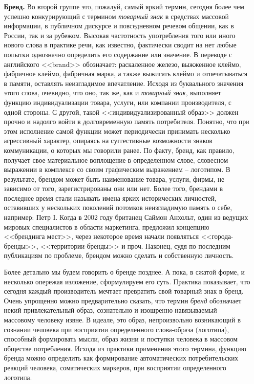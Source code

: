 \textbf{Бренд.} Во второй группе это, пожалуй, самый яркий термин,
  сегодня более чем успешно конкурирующий с термином \emph{товарный знак} в
  средствах массовой информации, в публичном дискурсе и повседневном речевом
  общении, как в России, так и за рубежом. Высокая частотность употребления
  того или иного нового слова в практике речи, как известно, фактически
  сводит на нет любые попытки однозначно определить его содержание или значение.
  В переводе с английского <<brand>> обозначает: раскаленное железо, выжженное
  клеймо, фабричное клеймо, фабричная марка, а также выжигать клеймо и
  отпечатываться в памяти, оставлять неизгладимое впечатление\autocite{oxford_dictionary}.
  Исходя из буквального значения этого слова, очевидно, что оно,
  так же, как и \emph{товарный знак}, выполняет функцию индивидуализации товара,
  услуги, или компании производителя, с одной стороны. С другой, такой
  <<индивидуализированный образ>> должен прочно и надолго войти в долговременную
  память потребителя. Понятно, что при этом исполнение самой функции может
  периодически принимать несколько агрессивный характер, опираясь на
  суггестивные возможности знаков коммуникации, о которых мы говорили ранее.
  По факту, бренд, как правило, получает свое материальное воплощение
  в определенном слове, словесном выражении в комплексе со своим
  графическим выражением -- логотипом. В результате, брендом может быть
  наименование товара, услуги, фирмы, не зависимо от того, зарегистрированы
  они или нет. Более того, брендами в последнее время стали называть имена
  ярких исторических личностей, оставивших у нескольких поколений потомков
  неизгладимую память о себе, например: Петр I. Когда в 2002 году британец
  Саймон Анхольт, один из ведущих мировых специалистов в области маркетинга,
  предложил концепцию <<брендинга мест>>, через некоторое время начали
  появляться <<города-бренды>>, <<территории-бренды>>  и
  проч\autocite{brending}. Наконец, судя по последним публикациям по проблеме,
  брендом можно сделать и собственную личность\autocites{peters1999brand}{schawbel2009me}{deckers2012branding}.

  Более детально мы будем говорить о бренде позднее. А пока, в сжатой форме,
  и несколько опережая изложение, сформулируем его суть. Практика показывает,
  что сегодня каждый производитель мечтает превратить свой товарный знак в бренд.
  Очень упрощенно можно предварительно сказать, что термин \emph{бренд} обозначает
  некий
  привлекательный образ, сознательно и изощренно навязываемый  массовому человеку
  извне. В идеале, это образ, непроизвольно возникающий в сознании человека при
  восприятии определенного слова-образа (логотипа), способный формировать мысли,
  образ жизни и поступки человека в массовом обществе потребления. Исходя из
  практики применения этого термина, функцию бренда можно определить как
  формирование автоматических потребительских реакций человека, соматических
  маркеров, при восприятии определенного логотипа.

